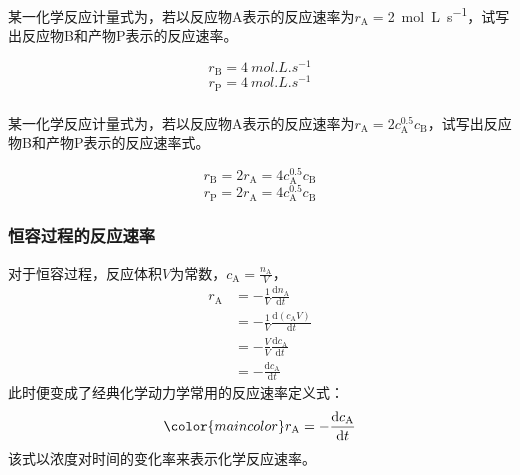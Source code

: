\begin{frame}[t]
    \frametitle{}
    \begin{example}
        某一化学反应计量式为，若以反应物A表示的反应速率为$r_\mathrm{A} = $\SI{2}{mol.L.s^{-1}}，试写出反应物B和产物P表示的反应速率。
    
    \tcblower
    \pause
    \[
        r_\mathrm{B} = \SI{4}{mol.L.s^{-1}}
    \]
    \[
        r_\mathrm{P} = \SI{4}{mol.L.s^{-1}}
    \]
    \end{example}
\end{frame}


\begin{frame}[t]
    \frametitle{}
    \begin{example}
        某一化学反应计量式为，若以反应物A表示的反应速率为$r_\mathrm{A} = 2c_\mathrm{A}^{0.5}c_\mathrm{B}$，试写出反应物B和产物P表示的反应速率式。
    
    \tcblower
    \pause
    \[
        r_\mathrm{B} = 2r_\mathrm{A} = 4c_\mathrm{A}^{0.5}c_\mathrm{B}
    \]
    \[
        r_\mathrm{P} = 2r_\mathrm{A} = 4c_\mathrm{A}^{0.5}c_\mathrm{B}
    \]
    \end{example}
\end{frame}


\begin{frame}
    \frametitle{恒容过程的反应速率}
    对于恒容过程，反应体积$V$为常数，$c_\mathrm{A}=\frac{n_\mathrm{A}}{V}$，
    \[
        \begin{aligned}
            r_\mathrm{A}&=-\frac1V\frac{\mathrm{d}n_\mathrm{A}}{\mathrm{d}t}\\
            &=-\frac{1}{V}\frac{\mathrm{d}(c_\mathrm{A} V)}{\mathrm{d}t}\\
            &=-\frac{V}{V}\frac{\mathrm{d}c_\mathrm{A}}{\mathrm{d}t}\\
            &=-\frac{\mathrm{d}c_\mathrm{A}}{\mathrm{d}t}
        \end{aligned}
    \]
    此时便变成了经典化学动力学常用的反应速率定义式：
    \[
        \color{maincolor}r_\mathrm{A}=-\frac{\mathrm{d}c_\mathrm{A}}{\mathrm{d}t}
    \]
    该式以浓度对时间的变化率来表示化学反应速率。
\end{frame}



